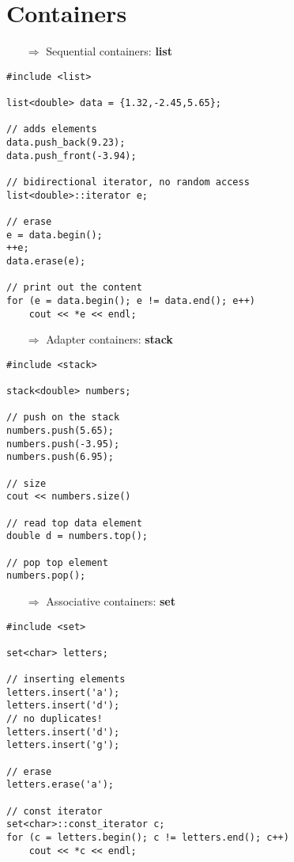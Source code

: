 \documentclass[10pt]{article}
\begin{document}
\section{Containers}
\small
\begin{enumerate}
\item[$\Rightarrow$] Sequential containers: \textbf{list}
\end{enumerate}
\begin{lstlisting}
#include <list>

list<double> data = {1.32,-2.45,5.65};

// adds elements
data.push_back(9.23);
data.push_front(-3.94);

// bidirectional iterator, no random access    
list<double>::iterator e;

// erase    
e = data.begin();
++e;
data.erase(e);

// print out the content    
for (e = data.begin(); e != data.end(); e++)
    cout << *e << endl;
\end{lstlisting}
\begin{enumerate}
\item[$\Rightarrow$] Adapter containers: \textbf{stack}
\end{enumerate}
\begin{lstlisting}
#include <stack>

stack<double> numbers;

// push on the stack
numbers.push(5.65);
numbers.push(-3.95);
numbers.push(6.95);

// size
cout << numbers.size()

// read top data element
double d = numbers.top();

// pop top element
numbers.pop();
\end{lstlisting}
\begin{enumerate}
\item[$\Rightarrow$] Associative containers: \textbf{set}
\end{enumerate}
\begin{lstlisting}
#include <set>

set<char> letters;

// inserting elements    
letters.insert('a');
letters.insert('d');
// no duplicates!
letters.insert('d');
letters.insert('g');

// erase    
letters.erase('a');

// const iterator 
set<char>::const_iterator c;   
for (c = letters.begin(); c != letters.end(); c++)
    cout << *c << endl;
\end{lstlisting}
\end{document}

